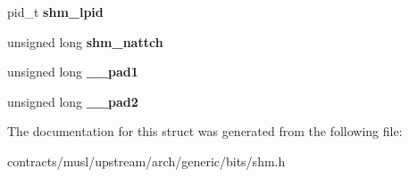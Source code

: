 \begin{DoxyCompactItemize}
\item 
\mbox{\label{structshmid__ds_a5539fd4cdac73e375697bbd59c39c29f}} 
pid\+\_\+t {\bfseries shm\+\_\+lpid}
\item 
\mbox{\label{structshmid__ds_a68a95433988a55ce183358e4e9fe4d41}} 
unsigned long {\bfseries shm\+\_\+nattch}
\item 
\mbox{\label{structshmid__ds_a34a4da4fb1e217399487b201f8f3c621}} 
unsigned long {\bfseries \+\_\+\+\_\+pad1}
\item 
\mbox{\label{structshmid__ds_ae9dd2a694b91cf85c9989a42e7ce07cb}} 
unsigned long {\bfseries \+\_\+\+\_\+pad2}
\end{DoxyCompactItemize}


The documentation for this struct was generated from the following file\+:\begin{DoxyCompactItemize}
\item 
contracts/musl/upstream/arch/generic/bits/shm.\+h\end{DoxyCompactItemize}
